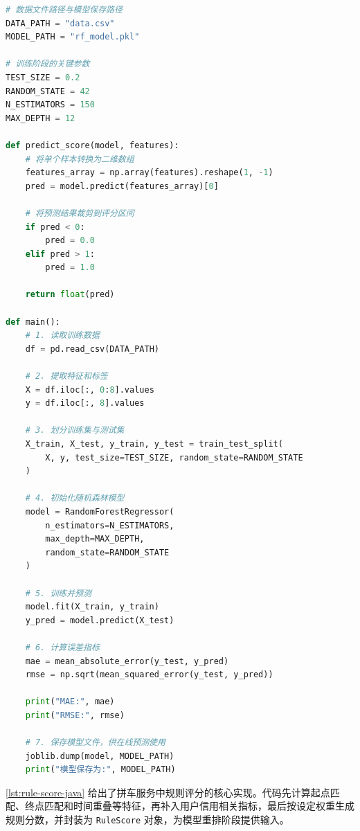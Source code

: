 \begin{lstlisting}[language=Python,caption={随机森林模型训练核心代码},label={lst:rf-train}]
# 数据文件路径与模型保存路径
DATA_PATH = "data.csv"
MODEL_PATH = "rf_model.pkl"

# 训练阶段的关键参数
TEST_SIZE = 0.2
RANDOM_STATE = 42
N_ESTIMATORS = 150
MAX_DEPTH = 12

def predict_score(model, features):
    # 将单个样本转换为二维数组
    features_array = np.array(features).reshape(1, -1)
    pred = model.predict(features_array)[0]

    # 将预测结果裁剪到评分区间
    if pred < 0:
        pred = 0.0
    elif pred > 1:
        pred = 1.0

    return float(pred)

def main():
    # 1. 读取训练数据
    df = pd.read_csv(DATA_PATH)

    # 2. 提取特征和标签
    X = df.iloc[:, 0:8].values
    y = df.iloc[:, 8].values

    # 3. 划分训练集与测试集
    X_train, X_test, y_train, y_test = train_test_split(
        X, y, test_size=TEST_SIZE, random_state=RANDOM_STATE
    )

    # 4. 初始化随机森林模型
    model = RandomForestRegressor(
        n_estimators=N_ESTIMATORS,
        max_depth=MAX_DEPTH,
        random_state=RANDOM_STATE
    )

    # 5. 训练并预测
    model.fit(X_train, y_train)
    y_pred = model.predict(X_test)

    # 6. 计算误差指标
    mae = mean_absolute_error(y_test, y_pred)
    rmse = np.sqrt(mean_squared_error(y_test, y_pred))

    print("MAE:", mae)
    print("RMSE:", rmse)

    # 7. 保存模型文件，供在线预测使用
    joblib.dump(model, MODEL_PATH)
    print("模型保存为:", MODEL_PATH)
\end{lstlisting}


\cref{lst:rule-score-java} 给出了拼车服务中规则评分的核心实现。代码先计算起点匹配、终点匹配和时间重叠等特征，再补入用户信用相关指标，最后按设定权重生成规则分数，并封装为 \texttt{RuleScore} 对象，为模型重排阶段提供输入。

